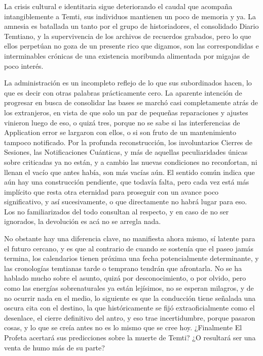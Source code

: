 \documentclass[
  spanish,
]{book}
\begin{document}
La crisis cultural e identitaria sigue deteriorando el caudal que acompaña intangiblemente a Temti, sus individuos mantienen un poco de memoria y ya. La amnesia es batallada un tanto por el grupo de historiadores, el consolidado Diario Temtiano, y la supervivencia de los archivos de recuerdos grabados, pero lo que ellos perpetúan no goza de un presente rico que digamos, son las correspondidas e interminables crónicas de una existencia moribunda alimentada por migajas de poco interés.

La administración es un incompleto reflejo de lo que sus subordinados hacen, lo que es decir con otras palabras prácticamente cero. La aparente intención de progresar en busca de consolidar las bases se marchó casi completamente atrás de los extranjeros, en vista de que solo un par de pequeñas reparaciones y ajustes vinieron luego de eso, o quizá tres, porque no se sabe si las interferencias de Application error se largaron con ellos, o si son fruto de un mantenimiento tampoco notificado. Por la profunda reconstrucción, los involuntarios Cierres de Sesiones, las Notificaciones Cuánticas, y más de aquellas peculiaridades únicas sobre criticadas ya no están, y a cambio las nuevas condiciones no reconfortan, ni llenan el vacío que antes había, son más vacías aún. El sentido común indica que aún hay una construcción pendiente, que todavía falta, pero cada vez está más implícito que resta otra eternidad para proseguir con un avance poco significativo, y así sucesivamente, o que directamente no habrá lugar para eso. Los no familiarizados del todo consultan al respecto, y en caso de no ser ignorados, la devolución es acá no se arregla nada.

No obstante hay una diferencia clave, no manifiesta ahora mismo, sí latente para el futuro cercano, y es que al contrario de cuando se sostenía que el paseo jamás termina, los calendarios tienen próxima una fecha potencialmente determinante, y las cronologías temtianas tarde o temprano tendrán que afrontarla. No se ha hablado mucho sobre el asunto, quizá por desconocimiento, o por olvido, pero como las energías sobrenaturales ya están lejísimos, no se esperan milagros, y de no ocurrir nada en el medio, lo siguiente es que la conducción tiene señalada una oscura cita con el destino, la que históricamente se fijó extraoficialmente como el desenlace, el cierre definitivo del antro, y eso trae incertidumbre, porque pasaron cosas, y lo que se creía antes no es lo mismo que se cree hoy. ¿Finalmente El Profeta acertará sus predicciones sobre la muerte de Temti? ¿O resultará ser una venta de humo más de su parte?
\end{document}
